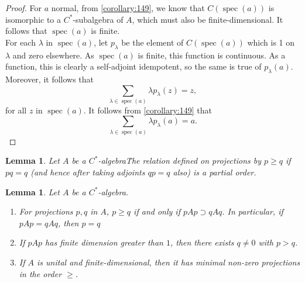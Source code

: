 \documentclass{book}
\newtheorem{lemma}[definition]{Lemma}
\def\cstar{\(C^*\)-algebra}
\begin{document}
\begin{proof}
  For \(a\) normal, from \ref{corollary:149}, we know that \(C(\operatorname{spec}(a))\) is isomorphic to
  a \(C^*\)-subalgebra of \(A\), which must also be finite-dimensional. It follows that
  \(\operatorname{spec}(a)\) is finite.\\
  For each \(\lambda\) in \(\operatorname{spec}(a)\), let \(p_\lambda\) be the element of \(C(\operatorname{spec}(a))\) which is 1 on
  \(\lambda\) and zero elsewhere. As \(\operatorname{spec}(a)\) is finite, this function is continuous. As
  a function, this is clearly a self-adjoint idempotent, so the same is true of
  \(p_\lambda(a)\). Moreover, it follows that
  \[
    \sum_{\lambda\in \operatorname{spec}(a)}\lambda p_\lambda(z) = z,
  \]
  for all \(z\) in \(\operatorname{spec}(a)\). It follows from \ref{corollary:149} that
  \[
    \sum_{\lambda\in \operatorname{spec}(a)}\lambda p_\lambda(a) = a.
  \]
\end{proof}
\begin{lemma}\label{lemma:175}
  Let \(A\) be a \cstar\. The relation defined on projections
  by \(p \geq q\) if \(pq = q\) (and hence after taking adjoints \(qp = q\) also) is a partial
  order.
\end{lemma}
\begin{lemma}\label{lemma:176}
  Let \(A\) be a \cstar.
\begin{enumerate}
  \item For projections \(p,q\) in \(A\), \(p \geq q\) if and only if \(pAp \supset  qAq\). In particular,
    if \(pAp = qAq\), then \(p = q\)
  \item If \(pAp\) has finite dimension greater than \(1\), then there exists \(q\neq 0\) with
    \(p > q\).
  \item If \(A\) is unital and finite-dimensional, then it has minimal non-zero
    projections in the order \(\geq\).
\end{enumerate}
\end{lemma}
\end{document}

